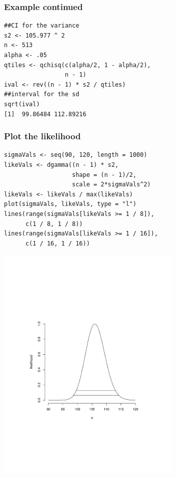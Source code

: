 \documentclass[aspectratio=169]{beamer}
\begin{document}
\begin{frame}[fragile]\frametitle{Example continued}
\begin{verbatim}
##CI for the variance
s2 <- 105.977 ^ 2
n <- 513
alpha <- .05
qtiles <- qchisq(c(alpha/2, 1 - alpha/2), 
                 n - 1)
ival <- rev((n - 1) * s2 / qtiles)
##interval for the sd
sqrt(ival)
[1]  99.86484 112.89216
\end{verbatim}
\end{frame}

\begin{frame}[fragile]\frametitle{Plot the likelihood}
\begin{verbatim}
sigmaVals <- seq(90, 120, length = 1000)
likeVals <- dgamma((n - 1) * s2,
                   shape = (n - 1)/2,
                   scale = 2*sigmaVals^2)
likeVals <- likeVals / max(likeVals)
plot(sigmaVals, likeVals, type = "l")
lines(range(sigmaVals[likeVals >= 1 / 8]), 
      c(1 / 8, 1 / 8))
lines(range(sigmaVals[likeVals >= 1 / 16]), 
      c(1 / 16, 1 / 16))
\end{verbatim}
\end{frame}


\begin{frame}
\includegraphics[width=3.5in]{varianceLikelihood.pdf}
\end{frame}
\end{document}

